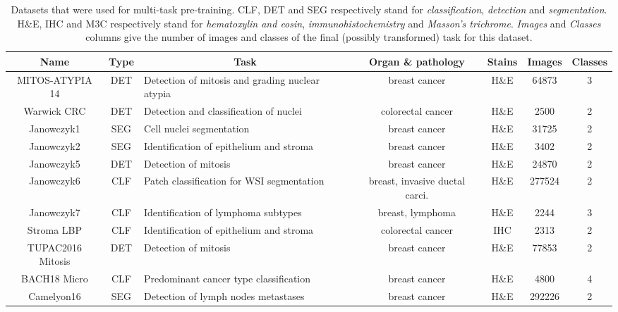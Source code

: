 \begin{table*}[t]
    \centering
    \caption{Datasets that were used for multi-task pre-training. CLF, DET and SEG respectively stand for \textit{classification}, \textit{detection} and \textit{segmentation}. H\&E, IHC and M3C respectively stand for \textit{hematoxylin and eosin}, \textit{immunohistochemistry} and \textit{Masson's trichrome}. \textit{Images} and \textit{Classes} columns give the number of images and classes of the final (possibly transformed) task for this dataset.} 
    \label{tab:mtask:datasets}
    \begin{tabular}{|c|c|l|c|c|c|c|}
        \hline
        \textbf{Name} & Type & \multicolumn{1}{c|}{Task} & Organ \& pathology & Stains & Images & Classes \\
        \hline
MITOS-ATYPIA 14 \cite{roux2014mitos}  & DET &  Detection of mitosis and grading nuclear atypia & breast cancer & H\&E & 64873 & 3 \\
Warwick CRC \cite{sirinukunwattana2016locality}  & DET &  Detection and classification of nuclei & colorectal cancer & H\&E & 2500 & 2 \\
Janowczyk1 \cite{janowczyk2016deep}  & SEG &  Cell nuclei segmentation & breast cancer & H\&E & 31725 & 2 \\
Janowczyk2 \cite{janowczyk2016deep}  & SEG &  Identification of epithelium and stroma & breast cancer & H\&E & 3402 & 2 \\
Janowczyk5 \cite{janowczyk2016deep}  & DET &  Detection of mitosis & breast cancer & H\&E & 24870 & 2 \\
Janowczyk6 \cite{janowczyk2016deep}  & CLF &  Patch classification for WSI segmentation & breast, invasive ductal carci. & H\&E & 277524 & 2 \\
Janowczyk7 \cite{janowczyk2016deep}  & CLF &  Identification of lymphoma subtypes & breast, lymphoma & H\&E & 2244 & 3 \\
Stroma LBP \cite{linder2012identification}  & CLF &  Identification of epithelium and stroma & colorectal cancer & IHC & 2313 & 2 \\
TUPAC2016 Mitosis \cite{veta2019predicting}  & DET &  Detection of mitosis & breast cancer & H\&E & 77853 & 2 \\
BACH18 Micro \cite{aresta2019bach}  & CLF &  Predominant cancer type classification & breast cancer & H\&E & 4800 & 4 \\ 
Camelyon16 \cite{bejnordi2017diagnostic}  & SEG &  Detection of lymph nodes metastases & breast cancer & H\&E & 292226 & 2 \\

\end{tabular}
\end{table*}
